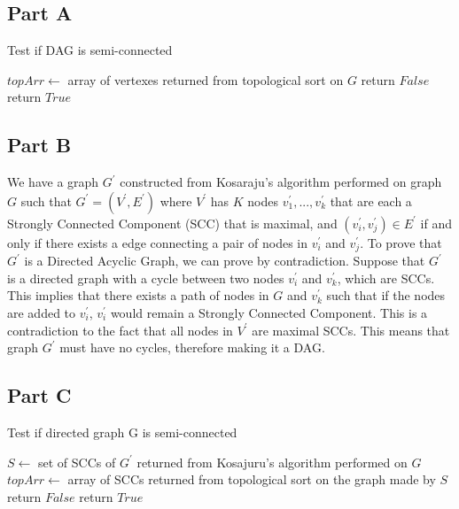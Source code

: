 \documentclass[12pt]{article}
\begin{document}
\subsection*{Part A}
\begin{algorithm}
\caption{Test if DAG is semi-connected}
\begin{algorithmic}[1]
    \State $topArr \gets $ array of vertexes returned from topological sort on $G$
            \State return $False$
        \EndIf
    \EndFor
    \State return $True$
\end{algorithmic}
\end{algorithm}

\subsection*{Part B}
We have a graph $G^\prime$ constructed from Kosaraju's algorithm
performed on graph $G$ such that $G^\prime = (V^\prime, E^\prime)$ where $V^\prime$
has $K$ nodes $v_1^\prime,...,v_k^\prime$ that are each a Strongly Connected Component (SCC)
that is maximal, and $(v_i^\prime, v_j^\prime) \in E^\prime$ if and only if there exists
a edge connecting a pair of nodes in $v_i^\prime$ and $v_j^\prime$.
\newline
\newline
To prove that $G^\prime$ is a Directed Acyclic Graph, we can prove by contradiction.
Suppose that $G^\prime$ is a directed graph with a cycle between two nodes $v_i^\prime$
and $v_k^\prime$, which are SCCs. This implies that there exists a path of nodes in $G$ 
and $v_k^\prime$ such that if the nodes are added to $v_i^\prime$, $v_i^\prime$ would 
remain a Strongly Connected Component. This is a contradiction to the fact that all nodes
in $V^\prime$ are maximal SCCs. This means that graph $G^\prime$ must have no cycles, 
therefore making it a DAG.

\subsection*{Part C}
\begin{algorithm}
\caption{Test if directed graph G is semi-connected}
\begin{algorithmic}
    \State $S \gets $ set of SCCs of $G^\prime$ returned from Kosajuru's algorithm performed on $G$
    \State $topArr \gets $ array of SCCs returned from topological sort on the graph made by $S$
            \State return $False$
        \EndIf
    \EndFor
    \State return $True$
\end{algorithmic}
\end{algorithm}
\end{document}
